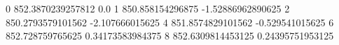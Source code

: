0 852.3870239257812 0.0
1 850.858154296875 -1.52886962890625
2 850.2793579101562 -2.107666015625
4 851.8574829101562 -0.529541015625
6 852.728759765625 0.34173583984375
8 852.6309814453125 0.24395751953125

